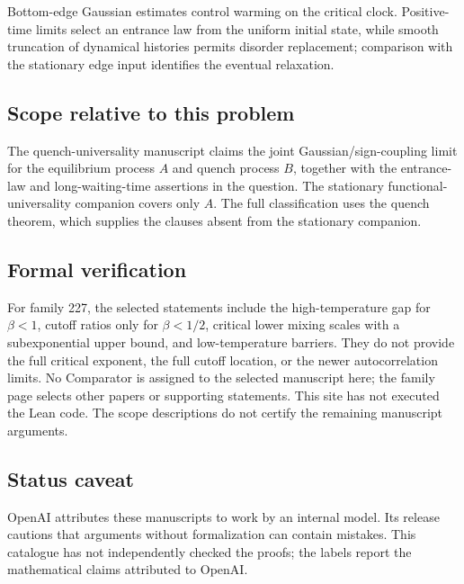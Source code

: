 \documentclass[11pt]{article}
\begin{document}
Bottom-edge Gaussian estimates control warming on the critical clock. Positive-time limits select an entrance law from the uniform initial state, while smooth truncation of dynamical histories permits disorder replacement; comparison with the stationary edge input identifies the eventual relaxation.

\subsection{Scope relative to this problem}
The quench-universality manuscript claims the joint Gaussian/sign-coupling limit for the equilibrium process $A$ and quench process $B$, together with the entrance-law and long-waiting-time assertions in the question. The stationary functional-universality companion covers only $A$. The full classification uses the quench theorem, which supplies the clauses absent from the stationary companion.

\subsection{Formal verification}
For family 227, the selected statements include the high-temperature gap for $\beta<1$, cutoff ratios only for $\beta<1/2$, critical lower mixing scales with a subexponential upper bound, and low-temperature barriers. They do not provide the full critical exponent, the full cutoff location, or the newer autocorrelation limits. No Comparator is assigned to the selected manuscript here; the family page selects other papers or supporting statements. This site has not executed the Lean code. The scope descriptions do not certify the remaining manuscript arguments.

\subsection{Status caveat}
OpenAI attributes these manuscripts to work by an internal model. Its release cautions that arguments without formalization can contain mistakes. This catalogue has not independently checked the proofs; the labels report the mathematical claims attributed to OpenAI.
\end{document}
